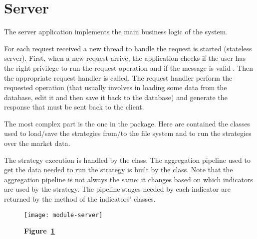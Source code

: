 \section{Server}\label{sec:server}

The server application implements the main business logic of the system.

For each request received a new thread to handle the request is started
(stateless server). First, when a new request arrive, the application checks if
the user has the right privilege to run the request operation and if the message
is valid . Then the appropriate
request handler is called. The request handler perform the requested operation
(that usually involves in loading some data from the database, edit it and then
save it back to the database) and generate the response that must be sent back
to the client.

The most complex part is the one in the  package. Here
are contained the classes used to load/save the strategies from/to the file
system and to run the strategies over the market data.

The strategy execution is handled by the  class. The
aggregation pipeline used to get the data needed to run the strategy is built by
the  class. Note that the aggregation pipeline is not
always the same: it changes based on which indicators are used by the strategy.
The pipeline stages needed by each indicator are returned by the
 method of the indicators' classes.

\begin{landscape}
	\begin{figure}[!ht]
		\texttt{[image: module-server]}
		\caption*{\textbf{Figure~\ref{fig:server}}}
		\captionlistentry{}\label{fig:server}
	\end{figure}
\end{landscape}
